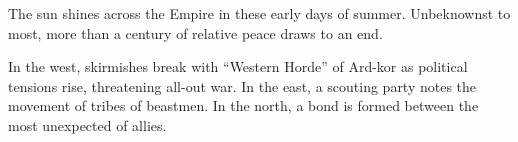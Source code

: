 The sun shines across the Empire in these early days of summer.
Unbeknownst to most, more than a century of relative peace draws to an end.

In the west, skirmishes break with ``Western Horde'' of Ard-kor as political tensions rise,
  threatening all-out war.
In the east, a scouting party notes the movement of tribes of beastmen.
In the north, a bond is formed between the most unexpected of allies.






